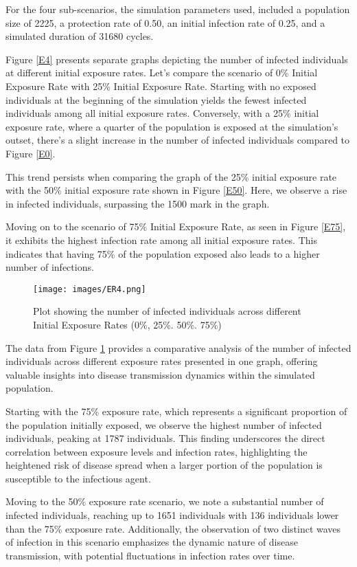 For the four sub-scenarios, the simulation parameters used, included a population size of 2225, a protection rate of 0.50, an initial infection rate of 0.25, and a simulated duration of 31680 cycles. 

Figure \ref{E4} presents separate graphs depicting the number of infected individuals at different initial exposure rates. Let's compare the scenario of 0\% Initial Exposure Rate with 25\% Initial Exposure Rate. Starting with no exposed individuals at the beginning of the simulation yields the fewest infected individuals among all initial exposure rates. Conversely, with a 25\% initial exposure rate, where a quarter of the population is exposed at the simulation's outset, there's a slight increase in the number of infected individuals compared to Figure \ref{E0}.

This trend persists when comparing the graph of the 25\% initial exposure rate with the 50\% initial exposure rate shown in Figure \ref{E50}. Here, we observe a rise in infected individuals, surpassing the 1500 mark in the graph.

Moving on to the scenario of 75\% Initial Exposure Rate, as seen in Figure \ref{E75}, it exhibits the highest infection rate among all initial exposure rates. This indicates that having 75\% of the population exposed also leads to a higher number of infections.

\begin{figure}[H]
	\centering
	\texttt{[image: images/ER4.png]}
	\caption{Plot showing the number of infected individuals across different Initial Exposure Rates (0\%, 25\%. 50\%. 75\%) }
	\label{fig:22}
\end{figure}

The data from Figure \ref{fig:22} provides a comparative analysis of the number of infected individuals across different exposure rates presented in one graph, offering valuable insights into disease transmission dynamics within the simulated population.

Starting with the 75\% exposure rate, which represents a significant proportion of the population initially exposed, we observe the highest number of infected individuals, peaking at 1787 individuals. This finding underscores the direct correlation between exposure levels and infection rates, highlighting the heightened risk of disease spread when a larger portion of the population is susceptible to the infectious agent.

Moving to the 50\% exposure rate scenario, we note a substantial number of infected individuals, reaching up to 1651 individuals with 136 individuals lower than the 75\% exposure rate. Additionally, the observation of two distinct waves of infection in this scenario emphasizes the dynamic nature of disease transmission, with potential fluctuations in infection rates over time.

